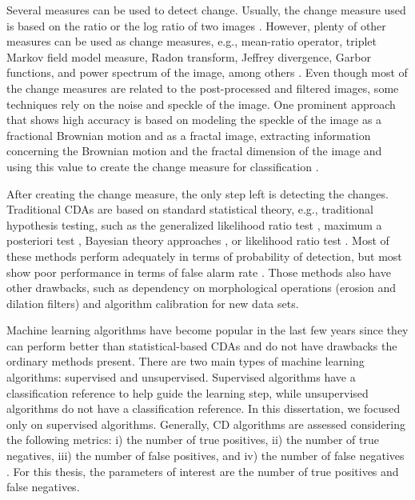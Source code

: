 Several measures can be used to detect change. Usually, the change measure used is based on the ratio or the log ratio of two images \cite{change6}. However, plenty of other measures can be used as change measures, e.g., mean-ratio operator, triplet Markov field model measure, Radon transform, Jeffrey divergence, Garbor functions, and power spectrum of the image, among others \cite{change5, change6, change7}. Even though most of the change measures are related to the post-processed and filtered images, some techniques rely on the noise and speckle of the image. One prominent approach that shows high accuracy is based on modeling the speckle of the image as a fractional Brownian motion and as a fractal image, extracting information concerning the Brownian motion and the fractal dimension of the image and using this value to create the change measure for classification \cite{change5}.

After creating the change measure, the only step left is detecting the changes. Traditional CDAs are based on standard statistical theory, e.g., traditional hypothesis testing, such as the generalized likelihood ratio test \cite{GLRT1,GLRT2,GLRT3}, maximum a posteriori test \cite{Book_Kay}, Bayesian theory approaches \cite{Bayes1, Bayes2}, or likelihood ratio test \cite{LRT1,LRT2,LRT3}. Most of these methods perform adequately in terms of probability of detection, but most show poor performance in terms of false alarm rate \cite{Carabas,Ricardo,LucasRamos,Chris}. Those methods also have other drawbacks, such as dependency on morphological operations (erosion and dilation filters) and algorithm calibration for new data sets.

Machine learning algorithms have become popular in the last few years \cite{Vinholi, Campos} since they can perform better than statistical-based CDAs and do not have drawbacks the ordinary methods present. There are two main types of machine learning algorithms: supervised and unsupervised. Supervised algorithms have a classification reference to help guide the learning step, while unsupervised algorithms do not have a classification reference. In this dissertation, we focused only on supervised algorithms. Generally, CD algorithms are assessed considering the following metrics: i) the number of true positives, ii) the number of true negatives, iii) the number of false positives, and iv) the number of false negatives \cite{PefMe}. For this thesis, the parameters of interest are the number of true positives and false negatives.

